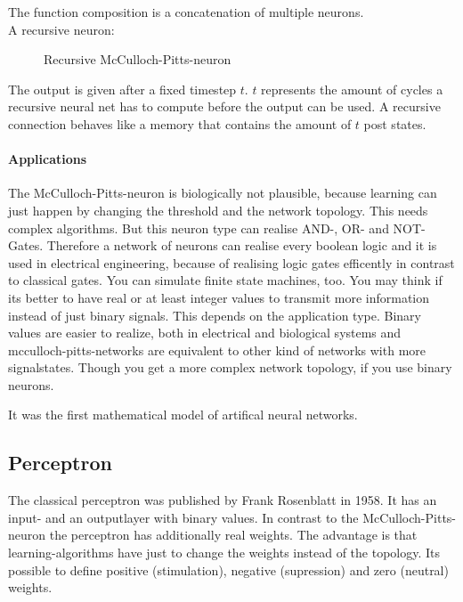 \documentclass[10pt,a4paper,DIV=11]{scrreprt}
\begin{document}
The function composition is a concatenation of multiple neurons. \\

A recursive neuron:

\begin{figure}[H]
	\centering
	\caption{Recursive McCulloch-Pitts-neuron}
	\label{fig:pitts3}
\end{figure}

The output is given after a fixed timestep $t$. $t$ represents the amount of cycles a recursive neural net has to compute before the output can be used. A recursive connection behaves like a memory that contains the amount of $t$ post states.

\paragraph{Applications}
The McCulloch-Pitts-neuron is biologically not plausible, because learning
can just happen by changing the threshold and the network topology. This
needs complex algorithms.
But this neuron type can realise AND-, OR- and NOT-Gates.
Therefore a network of neurons can realise every boolean logic and it is used in electrical engineering, because of realising logic gates efficently in contrast to classical gates. You can simulate finite state machines, too.
You may think if its better to have real or at least integer values to transmit more information instead of just binary signals. This depends on the application type. Binary values are easier to realize, both in electrical and biological systems and mcculloch-pitts-networks are equivalent to other kind of networks with more signalstates. Though you get a more complex network topology, if you use binary neurons.

It was the first mathematical model of artifical neural networks.\cite{NEURONMATH}


\subsection{Perceptron}
The classical perceptron was published by Frank Rosenblatt in 1958.
It has an input- and an outputlayer with binary values. In contrast to the McCulloch-Pitts-neuron
the perceptron has additionally real weights. The advantage is that learning-algorithms have just to change the weights instead of the topology. Its possible to define positive (stimulation), negative (supression) and zero (neutral) weights.
\end{document}
